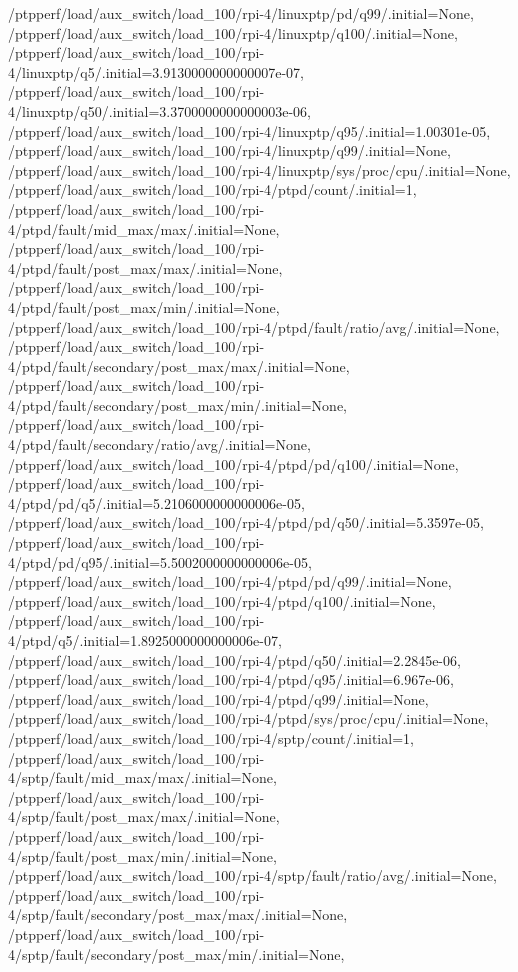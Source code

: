 {    /ptpperf/load/aux_switch/load_100/rpi-4/linuxptp/pd/q99/.initial=None,
    /ptpperf/load/aux_switch/load_100/rpi-4/linuxptp/q100/.initial=None,
    /ptpperf/load/aux_switch/load_100/rpi-4/linuxptp/q5/.initial=3.9130000000000007e-07,
    /ptpperf/load/aux_switch/load_100/rpi-4/linuxptp/q50/.initial=3.3700000000000003e-06,
    /ptpperf/load/aux_switch/load_100/rpi-4/linuxptp/q95/.initial=1.00301e-05,
    /ptpperf/load/aux_switch/load_100/rpi-4/linuxptp/q99/.initial=None,
    /ptpperf/load/aux_switch/load_100/rpi-4/linuxptp/sys/proc/cpu/.initial=None,
    /ptpperf/load/aux_switch/load_100/rpi-4/ptpd/count/.initial=1,
    /ptpperf/load/aux_switch/load_100/rpi-4/ptpd/fault/mid_max/max/.initial=None,
    /ptpperf/load/aux_switch/load_100/rpi-4/ptpd/fault/post_max/max/.initial=None,
    /ptpperf/load/aux_switch/load_100/rpi-4/ptpd/fault/post_max/min/.initial=None,
    /ptpperf/load/aux_switch/load_100/rpi-4/ptpd/fault/ratio/avg/.initial=None,
    /ptpperf/load/aux_switch/load_100/rpi-4/ptpd/fault/secondary/post_max/max/.initial=None,
    /ptpperf/load/aux_switch/load_100/rpi-4/ptpd/fault/secondary/post_max/min/.initial=None,
    /ptpperf/load/aux_switch/load_100/rpi-4/ptpd/fault/secondary/ratio/avg/.initial=None,
    /ptpperf/load/aux_switch/load_100/rpi-4/ptpd/pd/q100/.initial=None,
    /ptpperf/load/aux_switch/load_100/rpi-4/ptpd/pd/q5/.initial=5.2106000000000006e-05,
    /ptpperf/load/aux_switch/load_100/rpi-4/ptpd/pd/q50/.initial=5.3597e-05,
    /ptpperf/load/aux_switch/load_100/rpi-4/ptpd/pd/q95/.initial=5.5002000000000006e-05,
    /ptpperf/load/aux_switch/load_100/rpi-4/ptpd/pd/q99/.initial=None,
    /ptpperf/load/aux_switch/load_100/rpi-4/ptpd/q100/.initial=None,
    /ptpperf/load/aux_switch/load_100/rpi-4/ptpd/q5/.initial=1.8925000000000006e-07,
    /ptpperf/load/aux_switch/load_100/rpi-4/ptpd/q50/.initial=2.2845e-06,
    /ptpperf/load/aux_switch/load_100/rpi-4/ptpd/q95/.initial=6.967e-06,
    /ptpperf/load/aux_switch/load_100/rpi-4/ptpd/q99/.initial=None,
    /ptpperf/load/aux_switch/load_100/rpi-4/ptpd/sys/proc/cpu/.initial=None,
    /ptpperf/load/aux_switch/load_100/rpi-4/sptp/count/.initial=1,
    /ptpperf/load/aux_switch/load_100/rpi-4/sptp/fault/mid_max/max/.initial=None,
    /ptpperf/load/aux_switch/load_100/rpi-4/sptp/fault/post_max/max/.initial=None,
    /ptpperf/load/aux_switch/load_100/rpi-4/sptp/fault/post_max/min/.initial=None,
    /ptpperf/load/aux_switch/load_100/rpi-4/sptp/fault/ratio/avg/.initial=None,
    /ptpperf/load/aux_switch/load_100/rpi-4/sptp/fault/secondary/post_max/max/.initial=None,
    /ptpperf/load/aux_switch/load_100/rpi-4/sptp/fault/secondary/post_max/min/.initial=None,
}
